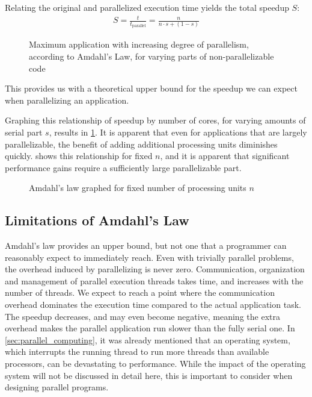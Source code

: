 \documentclass[BCOR20mm,DIV14,10pt,headinclude,footexclude,bibtotoc,liststotoc]{article}
\begin{document}
Relating the original and parallelized execution time yields the total speedup
$S$:
\begin{eqnarray}
	S = \frac{t}{t_\text{parallel}} = \frac{n}{n \cdot s + (1-s)}
\end{eqnarray}

\begin{figure}
	\centering
	
	\caption{Maximum application with increasing degree of parallelism, according to Amdahl's Law, for varying parts of non-parallelizable code}
	\label{fig:amdahl}
\end{figure}

This provides us with a theoretical upper bound for the speedup we can expect
when parallelizing an application.

Graphing this relationship of speedup by number of cores, for varying amounts of
serial part $s$, results in \cref{fig:amdahl}. It is apparent that even for
applications that are largely parallelizable, the benefit of adding additional
processing units diminishes quickly.  shows this
relationship for fixed $n$, and it is apparent that significant performance
gains require a sufficiently large parallelizable part.

\begin{figure}
	\centering
	
	\caption{Amdahl's law graphed for fixed number of processing units $n$}
	\label{fig:amdahl_inverted}
\end{figure}


\subsection{Limitations of Amdahl's Law}
Amdahl's law provides an upper bound, but not one that a programmer can
reasonably expect to immediately reach. Even with trivially parallel problems,
the overhead induced by parallelizing is never zero. Communication, organization
and management of parallel execution threads takes time, and increases with the
number of threads. We expect to reach a point where the communication overhead
dominates the execution time compared to the actual application task. The
speedup decreases, and may even become negative, meaning the extra overhead
makes the parallel application run slower than the fully serial one. In
\cref{sec:parallel_computing}, it was already mentioned that an operating
system, which interrupts the running thread to run more threads than available
processors, can be devastating to performance. While the impact of the operating
system will not be discussed in detail here, this is important to consider when
designing parallel programs.
\end{document}
